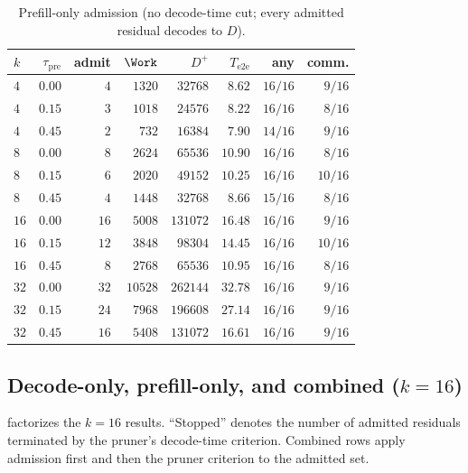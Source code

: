 \begin{table}[t]
\centering
\caption{Prefill-only admission (no decode-time cut; every admitted residual decodes to $D$).}
\label{tab:ablate-prefill}
\scriptsize
\setlength{\tabcolsep}{2.6pt}
\begin{tabular}{@{}lrrrrrrr@{}}
\toprule
$k$ & $\tau_{\mathrm{pre}}$ & admit & $\Work$ & $D^{+}$ & $T_{\mathrm{e2e}}$ & any & comm. \\
\midrule
$4$ & $0.00$ & $4$ & $1320$ & $32768$ & $8.62$ & $16/16$ & $9/16$ \\
\rowcolor{tblalt}
$4$ & $0.15$ & $3$ & $1018$ & $24576$ & $8.22$ & $16/16$ & $8/16$ \\
$4$ & $0.45$ & $2$ & $732$ & $16384$ & $7.90$ & $14/16$ & $9/16$ \\
\midrule
$8$ & $0.00$ & $8$ & $2624$ & $65536$ & $10.90$ & $16/16$ & $8/16$ \\
\rowcolor{tblalt}
$8$ & $0.15$ & $6$ & $2020$ & $49152$ & $10.25$ & $16/16$ & $10/16$ \\
$8$ & $0.45$ & $4$ & $1448$ & $32768$ & $8.66$ & $15/16$ & $8/16$ \\
\midrule
$16$ & $0.00$ & $16$ & $5008$ & $131072$ & $16.48$ & $16/16$ & $9/16$ \\
\rowcolor{tblalt}
$16$ & $0.15$ & $12$ & $3848$ & $98304$ & $14.45$ & $16/16$ & $10/16$ \\
$16$ & $0.45$ & $8$ & $2768$ & $65536$ & $10.95$ & $16/16$ & $8/16$ \\
\midrule
$32$ & $0.00$ & $32$ & $10528$ & $262144$ & $32.78$ & $16/16$ & $9/16$ \\
\rowcolor{tblalt}
$32$ & $0.15$ & $24$ & $7968$ & $196608$ & $27.14$ & $16/16$ & $9/16$ \\
$32$ & $0.45$ & $16$ & $5408$ & $131072$ & $16.61$ & $16/16$ & $9/16$ \\
\bottomrule
\end{tabular}
\end{table}

\subsection{Decode-only, prefill-only, and combined ($k{=}16$)}
\label{sec:ablate-combine}

 factorizes the $k{=}16$ results.
``Stopped'' denotes the number of admitted residuals terminated by the pruner's decode-time criterion.
Combined rows apply admission first and then the pruner criterion to the admitted set.

